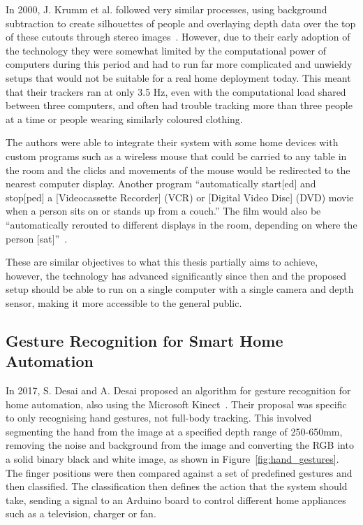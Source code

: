 In 2000, J. Krumm et al. followed very similar processes, using background subtraction to create silhouettes of people and overlaying depth data over the top of these cutouts through stereo images~\cite{Krum00}.
However, due to their early adoption of the technology they were somewhat limited by the computational power of computers during this period and had to run far more complicated and unwieldy setups that would not be suitable for a real home deployment today.
This meant that their trackers ran at only 3.5 Hz, even with the computational load shared between three computers, and often had trouble tracking more than three people at a time or people wearing similarly coloured clothing.

The authors were able to integrate their system with some home devices with custom programs such as a wireless mouse that could be carried to any table in the room and the clicks and movements of the mouse would be redirected to the nearest computer display.
Another program ``automatically start[ed] and stop[ped] a [Videocassette Recorder] (VCR) or [Digital Video Disc] (DVD) movie when a person sits on or stands up from a couch.''
The film would also be ``automatically rerouted to different displays in the room, depending on where the person [sat]''~\cite{Krum00}.

These are similar objectives to what this thesis partially aims to achieve, however, the technology has advanced significantly since then and the proposed setup should be able to run on a single computer with a single camera and depth sensor, making it more accessible to the general public.

\subsection{Gesture Recognition for Smart Home Automation}
In 2017, S. Desai and A. Desai proposed an algorithm for gesture recognition for home automation, also using the Microsoft Kinect~\cite{Desa17}.
Their proposal was specific to only recognising hand gestures, not full-body tracking.
This involved segmenting the hand from the image at a specified depth range of 250-650mm, removing the noise and background from the image and converting the RGB into a solid binary black and white image, as shown in Figure~\ref{fig:hand_gestures}.
The finger positions were then compared against a set of predefined gestures and then classified.
The classification then defines the action that the system should take, sending a signal to an Arduino board to control different home appliances such as a television, charger or fan.

